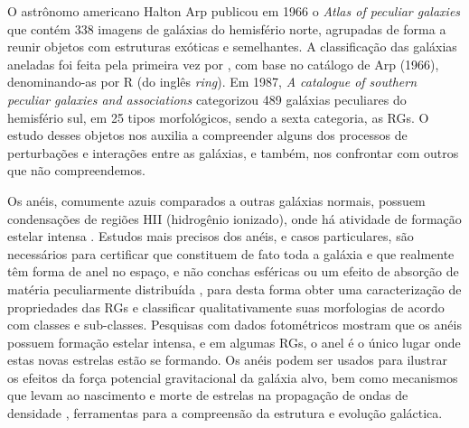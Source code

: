 O astrônomo americano Halton Arp publicou em 1966 o \emph{Atlas of peculiar galaxies} \cite{1966Arp} que contém 338 imagens de galáxias do hemisfério norte, agrupadas de forma a reunir objetos com estruturas exóticas e semelhantes. A classificação das galáxias aneladas foi feita pela primeira vez por , com base no catálogo de Arp (1966), denominando-as por R (do inglês \emph{ring}). Em 1987, \emph{A catalogue of southern peculiar galaxies and associations} \cite{1987arpmadore} categorizou 489 galáxias peculiares do hemisfério sul, em 25 tipos morfológicos, sendo a sexta categoria, as RGs. O estudo desses objetos nos auxilia a compreender alguns dos processos de perturbações e interações entre as galáxias, e também, nos confrontar com outros que não compreendemos.

Os anéis, comumente azuis comparados a outras galáxias normais, possuem condensações de regiões HII (hidrogênio ionizado), onde há atividade de formação estelar intensa \cite{2011fogarty}. Estudos mais precisos dos anéis, e casos particulares, são necessários para certificar que constituem de fato toda a galáxia e que realmente têm forma de anel no espaço, e não conchas esféricas ou um efeito de absorção de matéria peculiarmente distribuída \cite{Agosto1970}, para desta forma obter uma caracterização de propriedades das RGs e classificar qualitativamente suas morfologias de acordo com classes e sub-classes. Pesquisas com dados fotométricos \cite{2024MNRAS.527.2816M, 1999A&A...351..860M} mostram que os anéis possuem formação estelar intensa, e em algumas RGs, o anel é o único lugar onde estas novas estrelas estão se formando. Os anéis podem ser usados para ilustrar os efeitos da força potencial gravitacional da galáxia alvo, bem como mecanismos que levam ao nascimento e morte de estrelas na propagação de ondas de densidade \cite{Appleton96}, ferramentas para a compreensão da estrutura e evolução galáctica.

